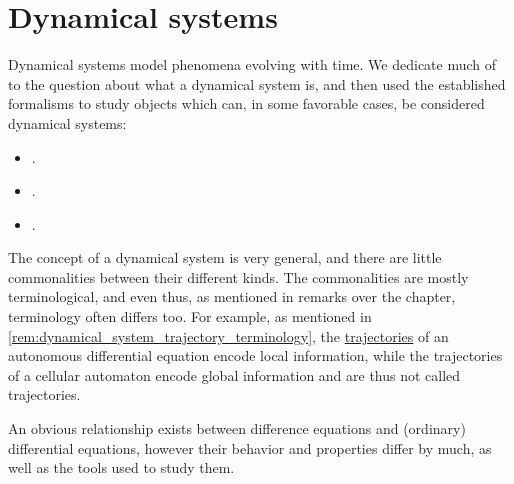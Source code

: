 \chapter{Dynamical systems}\label{ch:dynamical_systems}

Dynamical systems model phenomena evolving with time. We dedicate much of  to the question about what a dynamical system is, and then used the established formalisms to study objects which can, in some favorable cases, be considered dynamical systems:
\begin{itemize}
  \item {}.
  \item {}.
  \item {}.
\end{itemize}

The concept of a dynamical system is very general, and there are little commonalities between their different kinds. The commonalities are mostly terminological, and even thus, as mentioned in remarks over the chapter, terminology often differs too. For example, as mentioned in \cref{rem:dynamical_system_trajectory_terminology}, the \hyperref[def:dynamical_system_trajectory]{trajectories} of an autonomous differential equation encode local information, while the trajectories of a cellular automaton encode global information and are thus not called trajectories.

An obvious relationship exists between difference equations and (ordinary) differential equations, however their behavior and properties differ by much, as well as the tools used to study them.
